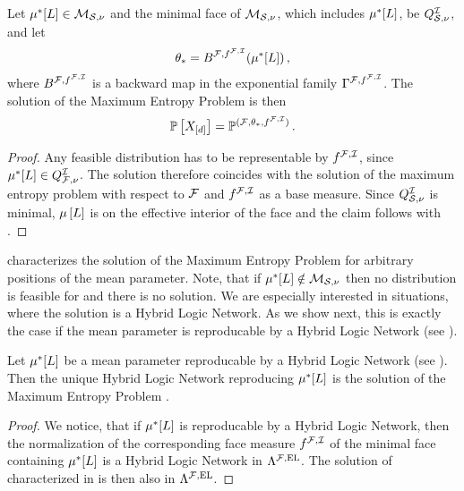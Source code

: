 \begin{theorem}
    \label{the:maxEntropyCharacterizationHLN}
    Let $\mu^*[L]\in\mathcal{M}_{\mathcal{S},\nu}$ and the minimal face of $\mathcal{M}_{\mathcal{S},\nu}$, which includes $\mu^*[L]$, be $Q^{\mathcal{I}}_{\mathcal{S},\nu}$, and let
    \begin{align*}
        \theta_{*} = B^{\mathcal{F},f^{\mathcal{F},\mathcal{I}}}(\mu^*[L]) \, ,
    \end{align*}
    where $B^{\mathcal{F},f^{\mathcal{F},\mathcal{I}}}$ is a backward map in the exponential family $\Gamma^{\mathcal{F},f^{\mathcal{F},\mathcal{I}}}$.
    The solution of the Maximum Entropy Problem  is then
    \begin{align*}
        \mathbb{P}\left[X_{[d]}\right] = \mathbb{P}^{(\mathcal{F},\theta_{*},f^{\mathcal{F},\mathcal{I}})} \, .
    \end{align*}
\end{theorem}
\begin{proof}
    Any feasible distribution has to be representable by $f^{\mathcal{F},\mathcal{I}}$, since $\mu^*[L]\in Q^{\mathcal{I}}_{\mathcal{F},\nu}$.
    The solution therefore coincides with the solution of the maximum entropy problem with respect to $\mathcal{F}$ and $f^{\mathcal{F},\mathcal{I}}$ as a base measure.
    Since $Q^{\mathcal{I}}_{\mathcal{S},\nu}$ is minimal, $\mu\left[L\right]$ is on the effective interior of the face and the claim follows with .
\end{proof}

 characterizes the solution of the Maximum Entropy Problem for arbitrary positions of the mean parameter.
Note, that if $\mu^*[L]\notin\mathcal{M}_{\mathcal{S},\nu}$ then no distribution is feasible for  and there is no solution.
We are especially interested in situations, where the solution is a Hybrid Logic Network.
As we show next, this is exactly the case if the mean parameter is reproducable by a Hybrid Logic Network (see ).

\begin{theorem}
    Let $\mu^*[L]$ be a mean parameter reproducable by a Hybrid Logic Network (see ).
    Then the unique Hybrid Logic Network reproducing $\mu^*[L]$ is the solution of the Maximum Entropy Problem .
\end{theorem}
\begin{proof}
    We notice, that if $\mu^*[L]$ is reproducable by a Hybrid Logic Network, then the normalization of the corresponding face measure $f^{\mathcal{F},\mathcal{I}}$ of the minimal face containing $\mu^*[L]$ is a Hybrid Logic Network in $\Lambda^{\mathcal{F},\mathrm{EL}}$.
    The solution of  characterized in  is then also in $\Lambda^{\mathcal{F},\mathrm{EL}}$.
\end{proof}


